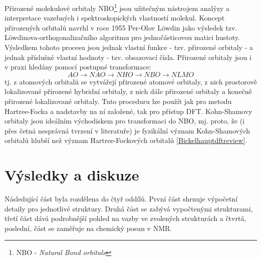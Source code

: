 \documentclass[
  digital, %
  table,   %
  lof,     %
  lot,     %
  oneside,
]{fithesis3}
\begin{document}
Přirozené molekulové orbitaly NBO\footnote{NBO - \textit{Natural Bond orbitals}} jsou užitečným nástrojem analýzy a interpretace vazebných i spektroskopických vlastností molekul. Koncept přirozených orbitalů navrhl v roce 1955 Per-Olov Löwdin jako výsledek tzv. Löwdinova-orthogonalizačního algoritmu pro jednočásticovou matici hustoty. Výsledkem tohoto procesu jsou jednak vlastní funkce - tzv. přirozené orbitaly - a jednak příslušné vlastní hodnoty - tzv. obsazovací čísla. Přirozené orbitaly jsou i v praxi hledány pomocí postupné transformace:
\begin{displaymath}
   AO \longrightarrow NAO \longrightarrow NHO \longrightarrow NBO \longrightarrow NLMO
\end{displaymath}
 tj. z atomových orbitalů se vytvářejí přirozené atomové orbitaly, z nich prostorově lokalizované přirozené hybridní orbitaly, z nich dále přirozené orbitaly  a konečně přirozené lokalizované orbitaly. Tuto proceduru lze použít jak pro metodu Hartree-Focka a nadstavby na ní založené, tak pro přístup DFT. Kohn-Shamovy orbitaly jsou ideálním východiskem pro transformaci do NBO, mj. proto, že (i přes četná nesprávná tvrzení v literatuře) je fyzikální význam Kohn-Shamových orbitalů hlubší než význam Hartree-Fockových orbitalů \ref{Bickelhauptdftreview}.

\chapter{Výsledky a diskuze}
Následující část byla rozdělena do čtyř oddílů. První část shrnuje výpočetní detaily pro jednotlivé struktury. Druhá  část se zabývá vypočtenými strukturami, třetí část dává podrobnější pohled na vazby ve zvolených strukturách a čtvrtá, poslední, část se zaměřuje na chemický posun v NMR.
\end{document}
